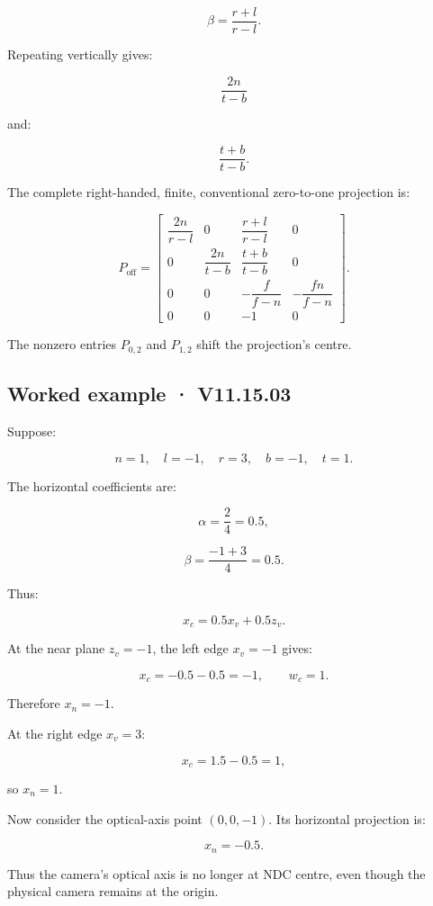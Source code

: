 \[ \boxed{\beta=\frac{r+l}{r-l}}. \]

Repeating vertically gives:

\[ \frac{2n}{t-b} \]

and:

\[ \frac{t+b}{t-b}. \]

The complete right-handed, finite, conventional zero-to-one projection is:

\[ \boxed{ P_{\mathrm{off}}= \begin{bmatrix} \dfrac{2n}{r-l}&0&\dfrac{r+l}{r-l}&0\\ 0&\dfrac{2n}{t-b}&\dfrac{t+b}{t-b}&0\\ 0&0&-\dfrac f{f-n}&-\dfrac{fn}{f-n}\\ 0&0&-1&0 \end{bmatrix}. } \]

The nonzero entries \(P_{0,2}\) and \(P_{1,2}\) shift the projection's centre.

\begin{allmightroleexample}

\subsection{Worked example · V11.15.03}\label{02-foundations-ii-ch035-worked-example-v11.15.03}

Suppose:

\end{allmightroleexample}

\[ n=1,\quad l=-1,\quad r=3,\quad b=-1,\quad t=1. \]

The horizontal coefficients are:

\[ \alpha=\frac{2}{4}=0.5, \]

\[ \beta=\frac{-1+3}{4}=0.5. \]

Thus:

\[ x_c=0.5x_v+0.5z_v. \]

At the near plane \(z_v=-1\), the left edge \(x_v=-1\) gives:

\[ x_c=-0.5-0.5=-1,\qquad w_c=1. \]

Therefore \(x_n=-1\).

At the right edge \(x_v=3\):

\[ x_c=1.5-0.5=1, \]

so \(x_n=1\).

Now consider the optical-axis point \((0,0,-1)\). Its horizontal projection is:

\[ x_n=-0.5. \]

Thus the camera's optical axis is no longer at NDC centre, even though the physical camera remains at the origin.

